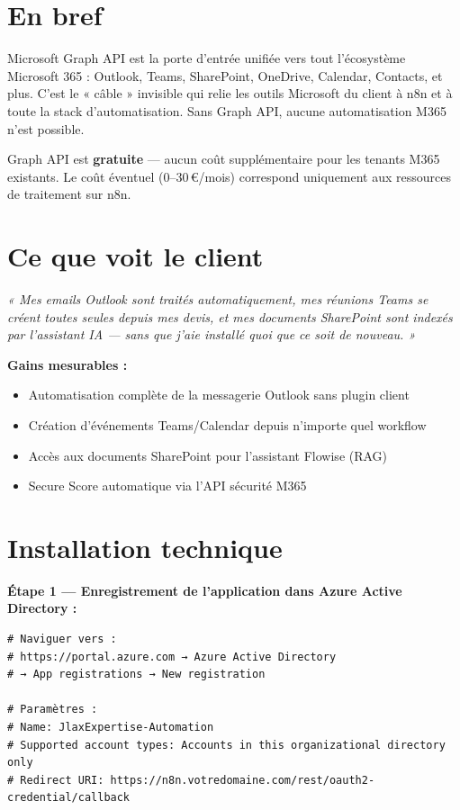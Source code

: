 \documentclass[11pt, a4paper]{article}
\begin{document}
\ficheHeader

\section*{En bref}
Microsoft Graph API est la porte d'entrée unifiée vers tout l'écosystème Microsoft 365 : Outlook, Teams, SharePoint, OneDrive, Calendar, Contacts, et plus. C'est le « câble » invisible qui relie les outils Microsoft du client à n8n et à toute la stack d'automatisation. Sans Graph API, aucune automatisation M365 n'est possible.

\begin{pointcle}
  Graph API est \textbf{gratuite} — aucun coût supplémentaire pour les tenants M365 existants. Le coût éventuel (0–30\,€/mois) correspond uniquement aux ressources de traitement sur n8n.
\end{pointcle}

\section{Ce que voit le client}

\begin{clientbox}
  \textit{« Mes emails Outlook sont traités automatiquement, mes réunions Teams se créent toutes seules depuis mes devis, et mes documents SharePoint sont indexés par l'assistant IA — sans que j'aie installé quoi que ce soit de nouveau. »}
\end{clientbox}

\textbf{Gains mesurables :}
\begin{itemize}
  \item Automatisation complète de la messagerie Outlook sans plugin client
  \item Création d'événements Teams/Calendar depuis n'importe quel workflow
  \item Accès aux documents SharePoint pour l'assistant Flowise (RAG)
  \item Secure Score automatique via l'API sécurité M365
\end{itemize}

\section{Installation technique}

\textbf{Étape 1 — Enregistrement de l'application dans Azure Active Directory :}

\begin{lstlisting}[style=terminal, caption={Accès au portail Azure}]
# Naviguer vers :
# https://portal.azure.com → Azure Active Directory
# → App registrations → New registration

# Paramètres :
# Name: JlaxExpertise-Automation
# Supported account types: Accounts in this organizational directory only
# Redirect URI: https://n8n.votredomaine.com/rest/oauth2-credential/callback
\end{lstlisting}
\end{document}
